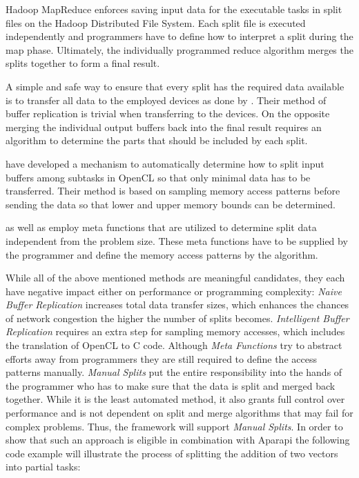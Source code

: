 \begin{description}[style=nextline]
	\item [Manual Splits]
	Hadoop MapReduce enforces saving input data for the executable tasks in split files on the Hadoop Distributed File System. Each split file is executed independently and programmers have to define how to interpret a split during the map phase. Ultimately, the individually programmed reduce algorithm merges the splits together to form a final result.
	
	\item [Naive Buffer Replication]
	A simple and safe way to ensure that every split has the required data available is to transfer all data to the employed devices as done by \citeauthor{delalama_2012}\cite{delalama_2012}. Their method of buffer replication is trivial when transferring to the devices. On the opposite merging the individual output buffers back into the final result requires an algorithm to determine the parts that should be included by each split.
	
	\item [Intelligent Buffer Replication]
	\citeauthor{Kim_2011}\cite{Kim_2011} have developed a mechanism to automatically determine how to split input buffers among subtasks in OpenCL so that only minimal data has to be transferred. Their method is based on sampling memory access patterns before sending the data so that lower and upper memory bounds can be determined.
		
	\item [Meta Functions]
	\citeauthor{stepocl}\cite{stepocl} as well as \citeauthor{distcl}\cite{distcl} employ meta functions that are utilized to determine split data independent from the problem size. These meta functions have to be supplied by the programmer and define the memory access patterns by the algorithm.
	
\end{description} 

While all of the above mentioned methods are meaningful candidates, they each have negative impact either on performance or programming complexity: \textit{Naive Buffer Replication} increases total data transfer sizes, which enhances the chances of network congestion the higher the number of splits becomes. \textit{Intelligent Buffer Replication} requires an extra step for sampling memory accesses, which includes the translation of OpenCL to C code. Although \textit{Meta Functions} try to abstract efforts away from programmers they are still required to define the access patterns manually. \textit{Manual Splits} put the entire responsibility into the hands of the programmer who has to make sure that the data is split and merged back together. While it is the least automated method, it also grants full control over performance and is not dependent on split and merge algorithms that may fail for complex problems. Thus, the framework will support \textit{Manual Splits}. In order to show that such an approach is eligible in combination with Aparapi the following code example will illustrate the process of splitting the addition of two vectors into partial tasks:

